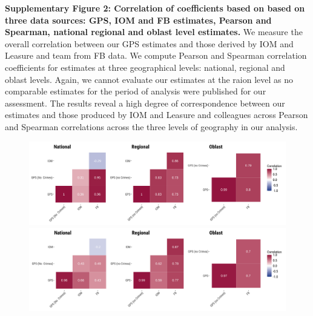 \documentclass[
  11pt,
]{article}
\begin{document}
\newpage

\textbf{Supplementary Figure 2: Correlation of coefficients based on
based on three data sources: GPS, IOM and FB estimates, Pearson and
Spearman, national regional and oblast level estimates.} We measure the
overall correlation between our GPS estimates and those derived by IOM
and Leasure and team from FB data. We compute Pearson and Spearman
correlation coefficients for estimates at three geographical levels:
national, regional and oblast levels. Again, we cannot evaluate our
estimates at the raion level as no comparable estimates for the period
of analysis were published for our assessment. The results reveal a high
degree of correspondence between our estimates and those produced by IOM
and Leasure and colleagues across Pearson and Spearman correlations
across the three levels of geography in our analysis.

\begin{figure}[h]

\begin{minipage}{\linewidth}

\includegraphics{../outputs/sm/correlations_pearson.png}

\end{minipage}%
\newline
\begin{minipage}{\linewidth}

\includegraphics{../outputs/sm/correlations_spearman.png}

\end{minipage}%

\end{figure}%
\end{document}
